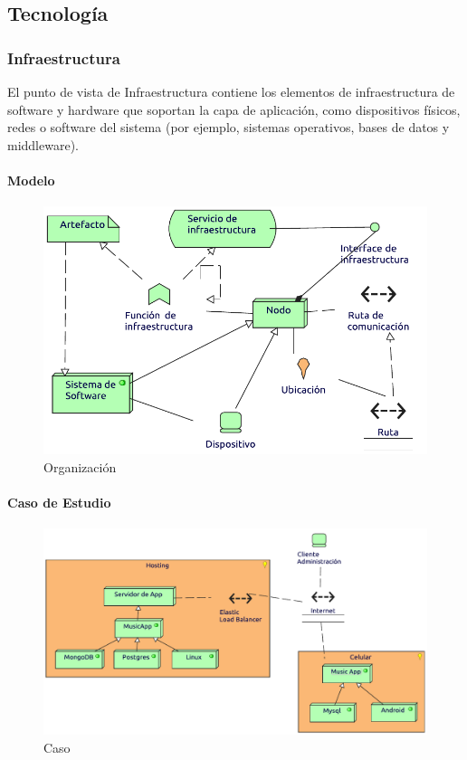 \subsection{Tecnología}

\subsubsection{Infraestructura}
El punto de vista de Infraestructura contiene los elementos de infraestructura de software y hardware que soportan la capa de aplicación, como dispositivos físicos, redes o software del sistema (por ejemplo, sistemas operativos, bases de datos y middleware).
\paragraph{Modelo}
\begin{figure}[h!]
	\centering
	\includegraphics[width=0.8\linewidth]{Desarrollo/ArquitecturaEmpresarial/Tecnologia/imgs/insfraestructuraMetamodelo.pdf}
	\caption{Organización}
\end{figure}
\newpage
\paragraph{Caso de Estudio}

\begin{figure}[h!]
	\centering
	\includegraphics[width=\linewidth]{Desarrollo/ArquitecturaEmpresarial/Tecnologia/imgs/insfraestructura.pdf}
	\caption{Caso}
\end{figure}

